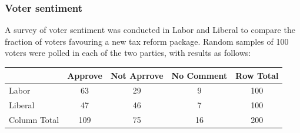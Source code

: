 \documentclass[a4paper]{article}\usepackage[]{graphicx}\usepackage[]{xcolor}
\begin{document}
\subsubsection{Voter sentiment}
A survey of voter sentiment was conducted in Labor and Liberal to compare the fraction of voters favouring a new tax reform package. Random samples of 100 voters were polled in each of the two parties, with results as follows:
\begin{table}[H]
	\centering
	\begin{tabular}{@{}lcccc@{}}
	\toprule
				 & Approve & Not Aprrove & No Comment & Row Total \\ \midrule
	Labor        & 63      & 29          & 9          & 100       \\
	Liberal      & 47      & 46          & 7          & 100       \\ \midrule
	Column Total & 109     & 75          & 16         & 200       \\ \bottomrule
	\end{tabular}
\end{table}
\end{document}
